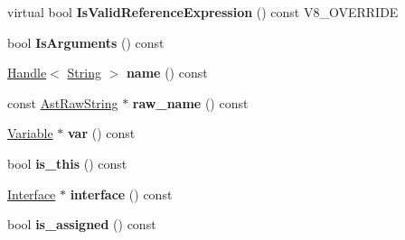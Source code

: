 \begin{DoxyCompactItemize}
\item 
\hypertarget{classv8_1_1internal_1_1_v8___f_i_n_a_l_ae124afe44a9598a41ff625ccfb1a524c}{}virtual bool {\bfseries Is\+Valid\+Reference\+Expression} () const V8\+\_\+\+O\+V\+E\+R\+R\+I\+D\+E\label{classv8_1_1internal_1_1_v8___f_i_n_a_l_ae124afe44a9598a41ff625ccfb1a524c}

\item 
\hypertarget{classv8_1_1internal_1_1_v8___f_i_n_a_l_a150b2f0b4b20e13d522ae2595b256037}{}bool {\bfseries Is\+Arguments} () const \label{classv8_1_1internal_1_1_v8___f_i_n_a_l_a150b2f0b4b20e13d522ae2595b256037}

\item 
\hypertarget{classv8_1_1internal_1_1_v8___f_i_n_a_l_ae093884f144601c733c3c49b3af199b4}{}\hyperlink{classv8_1_1internal_1_1_handle}{Handle}$<$ \hyperlink{classv8_1_1internal_1_1_string}{String} $>$ {\bfseries name} () const \label{classv8_1_1internal_1_1_v8___f_i_n_a_l_ae093884f144601c733c3c49b3af199b4}

\item 
\hypertarget{classv8_1_1internal_1_1_v8___f_i_n_a_l_a0bbcae15455f473754244ebb329b7e72}{}const \hyperlink{classv8_1_1internal_1_1_ast_raw_string}{Ast\+Raw\+String} $\ast$ {\bfseries raw\+\_\+name} () const \label{classv8_1_1internal_1_1_v8___f_i_n_a_l_a0bbcae15455f473754244ebb329b7e72}

\item 
\hypertarget{classv8_1_1internal_1_1_v8___f_i_n_a_l_acdba83c13d01fccc0e3982b83a9ae16d}{}\hyperlink{classv8_1_1internal_1_1_variable}{Variable} $\ast$ {\bfseries var} () const \label{classv8_1_1internal_1_1_v8___f_i_n_a_l_acdba83c13d01fccc0e3982b83a9ae16d}

\item 
\hypertarget{classv8_1_1internal_1_1_v8___f_i_n_a_l_a4efc9127e6b09ed103a8339886b25526}{}bool {\bfseries is\+\_\+this} () const \label{classv8_1_1internal_1_1_v8___f_i_n_a_l_a4efc9127e6b09ed103a8339886b25526}

\item 
\hypertarget{classv8_1_1internal_1_1_v8___f_i_n_a_l_a5f10aad0083b6e2ac0405e9631a60ca4}{}\hyperlink{classv8_1_1internal_1_1_interface}{Interface} $\ast$ {\bfseries interface} () const \label{classv8_1_1internal_1_1_v8___f_i_n_a_l_a5f10aad0083b6e2ac0405e9631a60ca4}

\item 
\hypertarget{classv8_1_1internal_1_1_v8___f_i_n_a_l_a15130905085b58f93896adfc66e5ad64}{}bool {\bfseries is\+\_\+assigned} () const \label{classv8_1_1internal_1_1_v8___f_i_n_a_l_a15130905085b58f93896adfc66e5ad64}


\end{DoxyCompactItemize}
